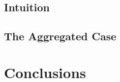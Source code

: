     
        
\section{Intuition} \label{sec:improved-aZKSMP-intuition}
    
    

    \section{The Aggregated Case} \label{sec:log-set-memb-Z}
        
        

        
%        

\chapter{Conclusions}

        
